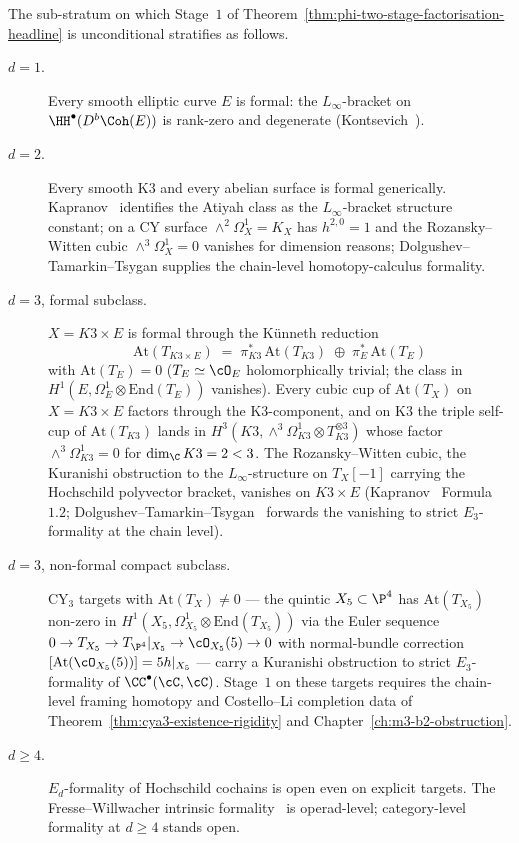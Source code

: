 \begin{proposition}
\label{prop:formal-locus-stratification}
The sub-stratum on which Stage~$1$ of
Theorem~\ref{thm:phi-two-stage-factorisation-headline} is
unconditional stratifies as follows.
\begin{description}
\item[$d = 1$.] Every smooth elliptic curve $E$ is formal: the
$L_\infty$-bracket on $\HH^\bullet(D^b\Coh(E))$ is rank-zero and
degenerate (Kontsevich~\cite{Kontsevich1999}).
\item[$d = 2$.] Every smooth K3 and every abelian surface is formal
generically. Kapranov~\cite{Kapranov1999} identifies the Atiyah
class as the $L_\infty$-bracket structure constant; on a CY surface
$\wedge^2 \Omega^1_X = K_X$ has $h^{2, 0} = 1$ and the
Rozansky--Witten cubic $\wedge^3 \Omega^1_X = 0$ vanishes for
dimension reasons; Dolgushev--Tamarkin--Tsygan
\cite{DolgushevTamarkinTsygan2010} supplies the chain-level
homotopy-calculus formality.
\item[$d = 3$, formal subclass.] $X = K3 \times E$ is formal through
the K\"unneth reduction
\[
 \mathrm{At}(T_{K3 \times E})
 \;=\;
 \pi_{K3}^*\,\mathrm{At}(T_{K3})
 \;\oplus\;
 \pi_E^*\,\mathrm{At}(T_E)
\]
with $\mathrm{At}(T_E) = 0$ ($T_E \simeq \cO_E$ holomorphically
trivial; the class in $H^1(E, \Omega^1_E \otimes \mathrm{End}(T_E))$
vanishes). Every cubic cup of $\mathrm{At}(T_X)$ on $X = K3 \times E$
factors through the K3-component, and on K3 the triple self-cup of
$\mathrm{At}(T_{K3})$ lands in
$H^3(K3, \wedge^3 \Omega^1_{K3} \otimes T_{K3}^{\otimes 3})$ whose
factor $\wedge^3 \Omega^1_{K3} = 0$ for $\dim_\C K3 = 2 < 3$. The
Rozansky--Witten cubic, the Kuranishi obstruction to the
$L_\infty$-structure on $T_X[-1]$ carrying the Hochschild polyvector
bracket, vanishes on $K3 \times E$
(Kapranov~\cite{Kapranov1999} Formula~$1.2$;
Dolgushev--Tamarkin--Tsygan~\cite{DolgushevTamarkinTsygan2010}
forwards the vanishing to strict $E_3$-formality at the chain level).
\item[$d = 3$, non-formal compact subclass.] CY$_3$ targets with
$\mathrm{At}(T_X) \neq 0$ — the quintic $X_5 \subset \P^4$ has
$\mathrm{At}(T_{X_5})$ non-zero in $H^1(X_5, \Omega^1_{X_5} \otimes
\mathrm{End}(T_{X_5}))$ via the Euler sequence
$0 \to T_{X_5} \to T_{\P^4}|_{X_5} \to \cO_{X_5}(5) \to 0$ with
normal-bundle correction
$[\mathrm{At}(\cO_{X_5}(5))] = 5 h|_{X_5}$ — carry a Kuranishi
obstruction to strict $E_3$-formality of $\CC^\bullet(\cC, \cC)$.
Stage~$1$ on these targets requires the chain-level framing homotopy
and Costello--Li completion data of
Theorem~\ref{thm:cya3-existence-rigidity} and
Chapter~\ref{ch:m3-b2-obstruction}.
\item[$d \geq 4$.] $E_d$-formality of Hochschild cochains is open
even on explicit targets. The Fresse--Willwacher intrinsic
formality~\cite{Willwacher2015} is operad-level; category-level
formality at $d \geq 4$ stands open.
\end{description}
\end{proposition}

